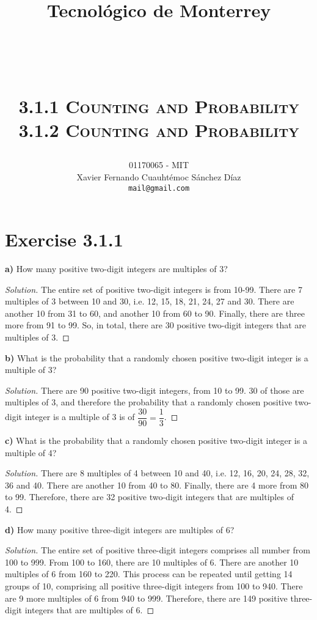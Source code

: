 \documentclass[titlepage, letterpaper, fleqn]{article}
\title{
\vspace{1in}
\textbf{Tecnológico de Monterrey} \\
\vspace{0.5in}
\textmd{\mahclass} \\
\large{\textit{\mahteacher}} \\
\vspace{0.5in}
\textsc{\mahtitle}\\
\textsc{3.1.1 Counting and Probability}\\
\textsc{3.1.2 Counting and Probability}\\
\author{01170065  - MIT \\
Xavier Fernando Cuauhtémoc Sánchez Díaz \\
\texttt{mail@gmail.com}}
\date{\mahdate}
}
\newcommand{\spacepls}{\vspace{5mm}}
\renewcommand\qedsymbol{\(\blacksquare\)}
\newenvironment{solution}
{\renewcommand\qedsymbol{$\square$}\begin{proof}[Solution]}
{\end{proof}}
\begin{document}
\begin{titlepage}
\maketitle
\end{titlepage}

%
%

\section{Exercise 3.1.1}

{\large \textbf{a)} How many positive two-digit integers are multiples of 3?}

\begin{solution}
The entire set of positive two-digit integers is from 10-99.
There are 7 multiples of 3 between 10 and 30, i.e. 12, 15, 18, 21, 24, 27 and 30.
There are another 10 from 31 to 60, and another 10 from 60 to 90.
Finally, there are three more from 91 to 99.
So, in total, there are 30 positive two-digit integers that are multiples of 3.
\end{solution}

\spacepls

{\large \textbf{b)} What is the probability that a randomly chosen positive two-digit integer is a multiple of 3?}

\begin{solution}
There are 90 positive two-digit integers, from 10 to 99.
30 of those are multiples of 3, and therefore the probability that a randomly chosen positive two-digit integer is a multiple of 3 is of \(\dfrac{30}{90} = \dfrac{1}{3}\).
\end{solution}

{\large \textbf{c)} What is the probability that a randomly chosen positive two-digit integer is a multiple of 4?}

\begin{solution}
There are 8 multiples of 4 between 10 and 40, i.e. 12, 16, 20, 24, 28, 32, 36 and 40.
There are another 10 from 40 to 80.
Finally, there are 4 more from 80 to 99.
Therefore, there are 32 positive two-digit integers that are multiples of 4.
\end{solution}

\spacepls

{\large \textbf{d)} How many positive three-digit integers are multiples of 6?}

\begin{solution}
The entire set of positive three-digit integers comprises all number from 100 to 999.
From 100 to 160, there are 10 multiples of 6.
There are another 10 multiples of 6 from 160 to 220.
This process can be repeated until getting 14 groups of 10, comprising all positive three-digit integers from 100 to 940.
There are 9 more multiples of 6 from 940 to 999.
Therefore, there are 149 positive three-digit integers that are multiples of 6.
\end{solution}
\end{document}
